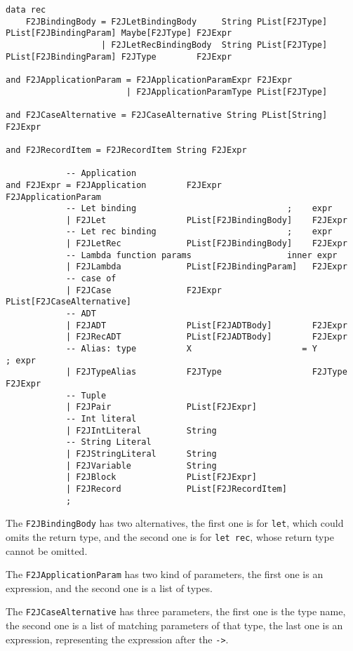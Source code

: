 \begin{lstlisting}
data rec
    F2JBindingBody = F2JLetBindingBody     String PList[F2JType] PList[F2JBindingParam] Maybe[F2JType] F2JExpr
                   | F2JLetRecBindingBody  String PList[F2JType] PList[F2JBindingParam] F2JType        F2JExpr

and F2JApplicationParam = F2JApplicationParamExpr F2JExpr
                        | F2JApplicationParamType PList[F2JType]

and F2JCaseAlternative = F2JCaseAlternative String PList[String] F2JExpr

and F2JRecordItem = F2JRecordItem String F2JExpr

            -- Application
and F2JExpr = F2JApplication        F2JExpr                  F2JApplicationParam
            -- Let binding                              ;    expr
            | F2JLet                PList[F2JBindingBody]    F2JExpr
            -- Let rec binding                          ;    expr
            | F2JLetRec             PList[F2JBindingBody]    F2JExpr
            -- Lambda function params                   inner expr
            | F2JLambda             PList[F2JBindingParam]   F2JExpr
            -- case of
            | F2JCase               F2JExpr                  PList[F2JCaseAlternative]
            -- ADT
            | F2JADT                PList[F2JADTBody]        F2JExpr
            | F2JRecADT             PList[F2JADTBody]        F2JExpr
            -- Alias: type          X                      = Y                         ; expr
            | F2JTypeAlias          F2JType                  F2JType                     F2JExpr
            -- Tuple
            | F2JPair               PList[F2JExpr]
            -- Int literal
            | F2JIntLiteral         String
            -- String Literal
            | F2JStringLiteral      String
            | F2JVariable           String
            | F2JBlock              PList[F2JExpr]
            | F2JRecord             PList[F2JRecordItem]
            ;
\end{lstlisting}

The \texttt{F2JBindingBody} has two alternatives, the first one is for \texttt{let}, which could omits the return type, and the second one is for \texttt{let rec}, whose return type cannot be omitted.

The \texttt{F2JApplicationParam} has two kind of parameters, the first one is an expression, and the second one is a list of types.

The \texttt{F2JCaseAlternative} has three parameters, the first one is the type name, the second one is a list of matching parameters of that type, the last one is an expression, representing the expression after the \texttt{-\textgreater}.

